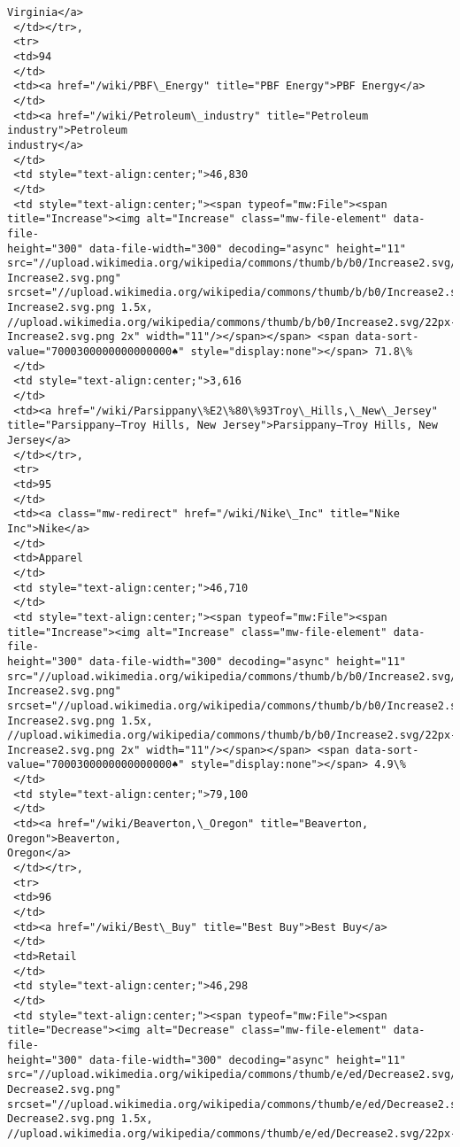 \documentclass[11pt]{article}
\begin{document}
\begin{tcolorbox}[breakable, size=fbox, boxrule=.5pt, pad at break*=1mm, opacityfill=0]
\begin{Verbatim}[commandchars=\\\{\}]
Virginia</a>
 </td></tr>,
 <tr>
 <td>94
 </td>
 <td><a href="/wiki/PBF\_Energy" title="PBF Energy">PBF Energy</a>
 </td>
 <td><a href="/wiki/Petroleum\_industry" title="Petroleum industry">Petroleum
industry</a>
 </td>
 <td style="text-align:center;">46,830
 </td>
 <td style="text-align:center;"><span typeof="mw:File"><span
title="Increase"><img alt="Increase" class="mw-file-element" data-file-
height="300" data-file-width="300" decoding="async" height="11"
src="//upload.wikimedia.org/wikipedia/commons/thumb/b/b0/Increase2.svg/11px-
Increase2.svg.png"
srcset="//upload.wikimedia.org/wikipedia/commons/thumb/b/b0/Increase2.svg/17px-
Increase2.svg.png 1.5x,
//upload.wikimedia.org/wikipedia/commons/thumb/b/b0/Increase2.svg/22px-
Increase2.svg.png 2x" width="11"/></span></span> <span data-sort-
value="7000300000000000000♠" style="display:none"></span> 71.8\%
 </td>
 <td style="text-align:center;">3,616
 </td>
 <td><a href="/wiki/Parsippany\%E2\%80\%93Troy\_Hills,\_New\_Jersey"
title="Parsippany–Troy Hills, New Jersey">Parsippany–Troy Hills, New Jersey</a>
 </td></tr>,
 <tr>
 <td>95
 </td>
 <td><a class="mw-redirect" href="/wiki/Nike\_Inc" title="Nike Inc">Nike</a>
 </td>
 <td>Apparel
 </td>
 <td style="text-align:center;">46,710
 </td>
 <td style="text-align:center;"><span typeof="mw:File"><span
title="Increase"><img alt="Increase" class="mw-file-element" data-file-
height="300" data-file-width="300" decoding="async" height="11"
src="//upload.wikimedia.org/wikipedia/commons/thumb/b/b0/Increase2.svg/11px-
Increase2.svg.png"
srcset="//upload.wikimedia.org/wikipedia/commons/thumb/b/b0/Increase2.svg/17px-
Increase2.svg.png 1.5x,
//upload.wikimedia.org/wikipedia/commons/thumb/b/b0/Increase2.svg/22px-
Increase2.svg.png 2x" width="11"/></span></span> <span data-sort-
value="7000300000000000000♠" style="display:none"></span> 4.9\%
 </td>
 <td style="text-align:center;">79,100
 </td>
 <td><a href="/wiki/Beaverton,\_Oregon" title="Beaverton, Oregon">Beaverton,
Oregon</a>
 </td></tr>,
 <tr>
 <td>96
 </td>
 <td><a href="/wiki/Best\_Buy" title="Best Buy">Best Buy</a>
 </td>
 <td>Retail
 </td>
 <td style="text-align:center;">46,298
 </td>
 <td style="text-align:center;"><span typeof="mw:File"><span
title="Decrease"><img alt="Decrease" class="mw-file-element" data-file-
height="300" data-file-width="300" decoding="async" height="11"
src="//upload.wikimedia.org/wikipedia/commons/thumb/e/ed/Decrease2.svg/11px-
Decrease2.svg.png"
srcset="//upload.wikimedia.org/wikipedia/commons/thumb/e/ed/Decrease2.svg/17px-
Decrease2.svg.png 1.5x,
//upload.wikimedia.org/wikipedia/commons/thumb/e/ed/Decrease2.svg/22px-

\end{Verbatim}
\end{tcolorbox}
\end{document}

